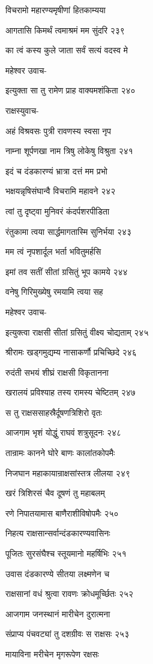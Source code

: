 विचरामो महारण्यमृषीणां हितकाम्यया

आगतासि किमर्थं त्वमाश्रमं मम सुंदरि २३९

का त्वं कस्य कुले जाता सर्वं सत्यं वदस्व मे

महेश्वर उवाच-

इत्युक्ता सा तु रामेण प्राह वाक्यमशंकिता २४०

राक्षस्युवाच-

अहं विश्रवसः पुत्री रावणस्य स्वसा नृप

नाम्ना शूर्पणखा नाम त्रिषु लोकेषु विश्रुता २४१

इदं च दंडकारण्यं भ्रात्रा दत्तं मम प्रभो

भक्षयन्नृषिसंघान्वै विचरामि महावने २४२

त्वां तु दृष्ट्वा मुनिवरं कंदर्पशरपीडिता

रंतुकामा त्वया सार्द्धमागतास्मि सुनिर्भया २४३

मम त्वं नृपशार्दूल भर्ता भवितुमर्हसि

इमां तव सतीं सीतां ग्रसितुं भूप कामये २४४

वनेषु गिरिमुख्येषु रमयामि त्वया सह

महेश्वर उवाच-

इत्युक्त्वा राक्षसी सीतां ग्रसितुं वीक्ष्य चोद्यताम् २४५

श्रीरामः खड्गमुद्यम्य नासाकर्णौ प्रचिच्छिदे २४६

रुदंती सभयं शीघ्रं राक्षसी विकृतानना

खरालयं प्रविश्याह तस्य रामस्य चेष्टितम् २४७

स तु राक्षससाहस्रैर्दूषणत्रिशिरो वृतः

आजगाम भृशं योद्धुं राघवं शत्रुसूदनः २४८

तान्रामः कानने घोरे बाणः कालांतकोपमैः

निजघान महाकायान्राक्षसांस्तत्र लीलया २४९

खरं त्रिशिरसं चैव दूषणं तु महाबलम्

रणे निपातयामास बाणैराशीविषोपमैः २५०

निहत्य राक्षसान्सर्वान्दंडकारण्यवासिनः

पूजितः सुरसंघैश्च स्तूयमानो महर्षिभिः २५१

उवास दंडकारण्ये सीतया लक्ष्मणेन च

राक्षसानां वधं श्रुत्वा रावणः क्रोधमूर्च्छितः २५२

आजगाम जनस्थानं मारीचेन दुरात्मना

संप्राप्य पंचवट्यां तु दशग्रीवः स राक्षसः २५३

मायाविना मरीचेन मृगरूपेण रक्षसः

